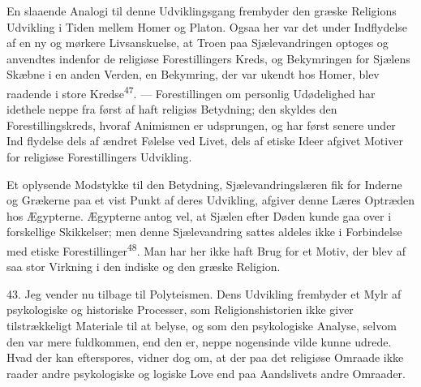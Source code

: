 \documentclass[12pt,a4paper,openany]{book}
\newcommand{\opage}[1]{\marginnote{\footnotesize\textit{[#1]}}}
\begin{document}
En slaaende Analogi til denne Udviklingsgang frembyder den græske
Religions Udvikling i Tiden mellem Homer og Platon. Ogsaa her var det
under Indflydelse af en ny og mørkere Livsanskuelse, at Troen paa
Sjælevandringen optoges og anvendtes indenfor de religiøse
Forestillingers Kreds, og Bekymringen for Sjælens Skæbne i en anden
Verden, en Bekymring, der var ukendt hos Homer, blev raadende i store
Kredse\textsuperscript{47}. --- Forestillingen om personlig Udødelighed
har idethele neppe fra først af haft religiøs Betydning; den skyldes den
Forestillingskreds, hvoraf Animismen er udsprungen, og har først senere
under Ind%
\opage{100}flydelse dels af ændret Følelse ved Livet, dels af etiske
Ideer afgivet Motiver for religiøse Forestillingers Udvikling.

Et oplysende Modstykke til den Betydning, Sjælevandringslæren fik for
Inderne og Grækerne paa et vist Punkt af deres Udvikling, afgiver denne
Læres Optræden hos Ægypterne. Ægypterne antog vel, at Sjælen efter Døden
kunde gaa over i forskellige Skikkelser; men denne Sjælevandring sattes
aldeles ikke i Forbindelse med etiske
Forestillinger\textsuperscript{48}. Man har her ikke haft Brug for et
Motiv, der blev af saa stor Virkning i den indiske og den græske
Religion.

43. Jeg vender nu tilbage til Polyteismen. Dens Udvikling frembyder et
Mylr af psykologiske og historiske Processer, som Religionshistorien
ikke giver tilstrækkeligt Materiale til at belyse, og som den
psykologiske Analyse, selvom den var mere fuldkommen, end den er, neppe
nogensinde vilde kunne udrede. Hvad der kan efterspores, vidner dog om,
at der paa det religiøse Omraade ikke raader andre psykologiske og
logiske Love end paa Aandslivets andre Omraader.
\end{document}
